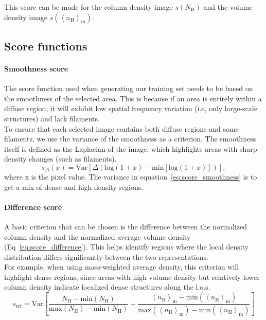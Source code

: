 \documentclass{aa}
\newcommand{\aver}[1]{\ensuremath{\left\langle #1 \right\rangle}}
\newcommand{\nh}{\ensuremath{n_\text{H}}}
\newcommand{\Nh}{\ensuremath{N_\text{H}}}
\newcommand{\nmh}{\ensuremath{\aver{\nh}_{\text{m}}}}
\begin{document}
\begin{appendix}
   This score can be made for the column density image $s(\Nh)$ and the volume density image $s(\nmh)$.
   \subsection{Score functions}
   \paragraph{Smoothness score}
   The score function used when generating our training set needs to be based on the smoothness of the selected area.
   This is because if an area is entirely within a diffuse region, it will exhibit low spatial frequency variation (i.e, only large-scale structures)
   and lack filaments.
   \\ To ensure that each selected image contains both diffuse regions and some filaments, we use the variance of the smoothness as a criterion.
   The smoothness itself is defined as the Laplacian of the image, which highlights areas with sharp density changes (such as filaments).
   \begin{equation}
      \label{eq:score_smoothness}
      s_\Delta(x)=\mathrm{Var}[\Delta(\mathrm{log}(1+x)-\mathrm{min}[\mathrm{log}(1+x)])],
   \end{equation}
   where x is the pixel value. The variance in equation~\ref{eq:score_smoothness} is to get a mix of dense and high-density regions.
   \paragraph{Difference score}
   A basic criterion that can be chosen is the difference between the normalized column density and the normalized average volume density (Eq~\ref{eq:score_difference}).
   This helps identify regions where the local density distribution differs significantly between the two representations.
   \\For example, when using mass-weighted average density, this criterion will highlight dense regions, since areas with high volume density but relatively lower column density indicate localized dense structures along the l.o.s.
   \begin{equation}
      \label{eq:score_difference}
      s_{\mathrm{ref}}=\mathrm{Var}[\frac{\Nh-\mathrm{min}(\Nh)}{\mathrm{max}(\Nh)-\mathrm{min}(\Nh)}-\frac{\nmh-\mathrm{min}(\nmh)}{\mathrm{max}(\nmh)-\mathrm{min}(\nmh)}]
   \end{equation}


\end{appendix}
\end{document}

